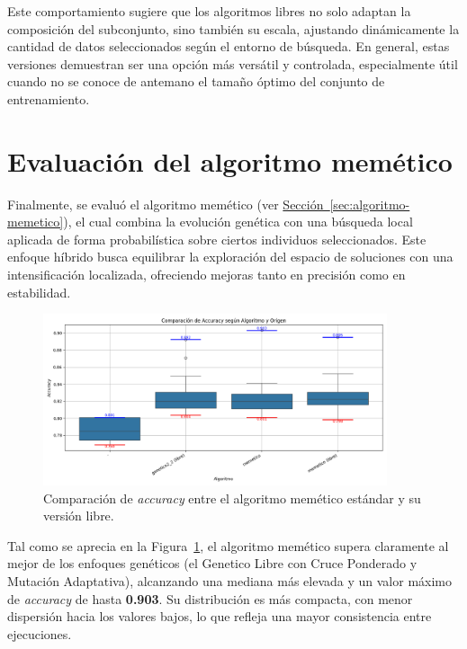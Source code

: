 Este comportamiento sugiere que los algoritmos libres no solo adaptan la composición del subconjunto, sino también su escala,
ajustando dinámicamente la cantidad de datos seleccionados según el entorno de búsqueda.
En general, estas versiones demuestran ser una opción más versátil y controlada, especialmente útil cuando no se conoce de antemano el tamaño óptimo del conjunto de entrenamiento.


\section{Evaluación del algoritmo memético}\label{sec:evaluacion-algoritmo-memetico}
Finalmente, se evaluó el algoritmo memético (ver \hyperref[sec:algoritmo-memetico]{Sección~\ref*{sec:algoritmo-memetico}}),
el cual combina la evolución genética con una búsqueda local aplicada de forma probabilística sobre ciertos individuos seleccionados.
Este enfoque híbrido busca equilibrar la exploración del espacio de soluciones con una intensificación localizada,
ofreciendo mejoras tanto en precisión como en estabilidad.


\begin{figure}[htp]
    \centering
    \includegraphics[width=0.9\textwidth]{imagenes/evaluaciones/comparacion-memetico}
    \caption{Comparación de \textit{accuracy} entre el algoritmo memético estándar y su versión libre.}
    \label{fig:memetico_comparacion}
\end{figure}

Tal como se aprecia en la Figura~\ref{fig:memetico_comparacion}, el algoritmo memético supera claramente al mejor de los enfoques genéticos
(el Genetico Libre con Cruce Ponderado y Mutación Adaptativa), alcanzando una mediana más elevada y un valor máximo de \textit{accuracy} de hasta \textbf{0.903}.
Su distribución es más compacta, con menor dispersión hacia los valores bajos, lo que refleja una mayor consistencia entre ejecuciones.

